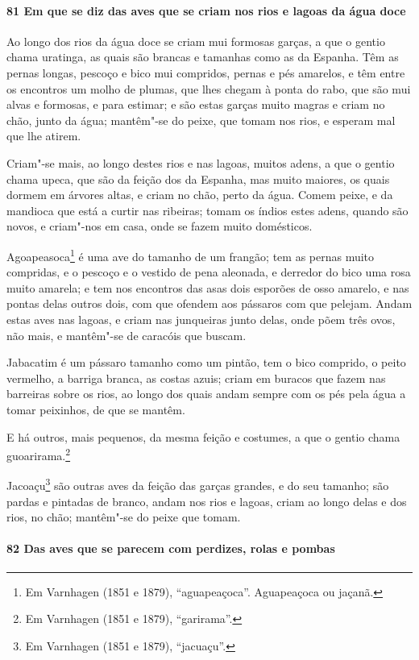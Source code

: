 \paragraph{81 Em que se diz das aves que se criam nos rios e lagoas da água doce}

Ao longo dos rios da água doce se criam mui formosas garças, a que o gentio chama
uratinga, as quais são brancas e tamanhas como as da Espanha. Têm as pernas longas,
pescoço e bico mui compridos, pernas e pés amarelos, e têm entre os encontros um molho de
plumas, que lhes chegam à ponta do rabo, que são mui alvas e formosas, e para estimar; e
são estas garças muito magras e criam no chão, junto da água; mantêm"-se do peixe, que
tomam nos rios, e esperam mal que lhe atirem.

Criam"-se mais, ao longo destes rios e nas lagoas, muitos adens, a que o gentio chama
upeca, que são da feição dos da Espanha, mas muito maiores, os quais dormem em árvores
altas, e criam no chão, perto da água. Comem peixe, e da mandioca que está a curtir nas
ribeiras; tomam os índios estes adens, quando são novos, e criam"-nos em casa, onde se
fazem muito domésticos.

Agoapeasoca\footnote{ Em Varnhagen (1851 e 1879), ``aguapeaçoca''. Aguapeaçoca ou jaçanã.}
é uma ave do tamanho de um frangão; tem as pernas muito compridas, e o pescoço e o vestido
de pena aleonada, e derredor do bico uma rosa muito amarela; e tem nos encontros das asas
dois esporões de osso amarelo, e nas pontas delas outros dois, com que ofendem aos
pássaros com que pelejam. Andam estas aves nas lagoas, e criam nas junqueiras junto delas,
onde põem três ovos, não mais, e mantêm"-se de caracóis que buscam.

Jabacatim é um pássaro tamanho como um pintão, tem o bico comprido, o peito vermelho, a
barriga branca, as costas azuis; criam em buracos que fazem nas barreiras sobre os rios,
ao longo dos quais andam sempre com os pés pela água a tomar peixinhos, de que se mantêm.

E há outros, mais pequenos, da mesma feição e costumes, a que o gentio chama
guoarirama.\footnote{ Em Varnhagen (1851 e 1879), ``garirama''.}

Jacoaçu\footnote{ Em Varnhagen (1851 e 1879), ``jacuaçu''.} são outras aves da feição das
garças grandes, e do seu tamanho; são pardas e pintadas de branco, andam nos rios e
lagoas, criam ao longo delas e dos rios, no chão; mantêm"-se do peixe que tomam.

\paragraph{82 Das aves que se parecem com perdizes, rolas e pombas}

